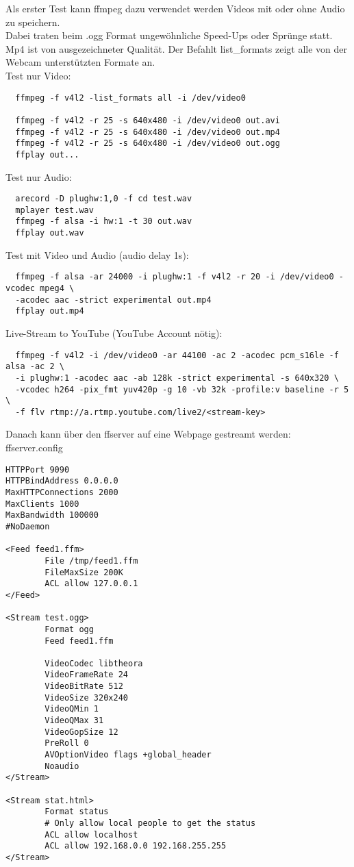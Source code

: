 Als erster Test kann ffmpeg dazu verwendet werden Videos mit oder ohne Audio zu speichern.\\
Dabei traten beim .ogg Format ungewöhnliche Speed-Ups oder Sprünge statt. Mp4 ist von 
ausgezeichneter Qualität. Der Befahlt list\_formats zeigt alle von der Webcam unterstützten 
Formate an.\\

Test nur Video:
\begin{verbatim}
  ffmpeg -f v4l2 -list_formats all -i /dev/video0

  ffmpeg -f v4l2 -r 25 -s 640x480 -i /dev/video0 out.avi
  ffmpeg -f v4l2 -r 25 -s 640x480 -i /dev/video0 out.mp4
  ffmpeg -f v4l2 -r 25 -s 640x480 -i /dev/video0 out.ogg
  ffplay out...
\end{verbatim}

Test nur Audio:
\begin{verbatim}
  arecord -D plughw:1,0 -f cd test.wav
  mplayer test.wav
  ffmpeg -f alsa -i hw:1 -t 30 out.wav
  ffplay out.wav
\end{verbatim}

Test mit Video und Audio (audio delay 1s):
\begin{verbatim}
  ffmpeg -f alsa -ar 24000 -i plughw:1 -f v4l2 -r 20 -i /dev/video0 -vcodec mpeg4 \
  -acodec aac -strict experimental out.mp4
  ffplay out.mp4
\end{verbatim}

Live-Stream to YouTube (YouTube Account nötig):
\begin{verbatim}
  ffmpeg -f v4l2 -i /dev/video0 -ar 44100 -ac 2 -acodec pcm_s16le -f alsa -ac 2 \
  -i plughw:1 -acodec aac -ab 128k -strict experimental -s 640x320 \
  -vcodec h264 -pix_fmt yuv420p -g 10 -vb 32k -profile:v baseline -r 5 \ 
  -f flv rtmp://a.rtmp.youtube.com/live2/<stream-key>
\end{verbatim}

Danach kann über den ffserver auf eine Webpage gestreamt werden:\\
ffserver.config
\begin{verbatim}
HTTPPort 9090
HTTPBindAddress 0.0.0.0
MaxHTTPConnections 2000
MaxClients 1000
MaxBandwidth 100000
#NoDaemon

<Feed feed1.ffm>
        File /tmp/feed1.ffm
        FileMaxSize 200K
        ACL allow 127.0.0.1
</Feed>

<Stream test.ogg>
        Format ogg
        Feed feed1.ffm

        VideoCodec libtheora
        VideoFrameRate 24
        VideoBitRate 512
        VideoSize 320x240
        VideoQMin 1
        VideoQMax 31
        VideoGopSize 12
        PreRoll 0
        AVOptionVideo flags +global_header
        Noaudio
</Stream>

<Stream stat.html>
        Format status
        # Only allow local people to get the status
        ACL allow localhost
        ACL allow 192.168.0.0 192.168.255.255
</Stream>                         
\end{verbatim}

